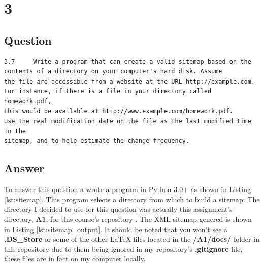 \documentclass[letterpaper,11pt]{article}
\newcommand*{\srcPath}{../src}%
\begin{document}
\clearpage


\section*{3}

\subsection*{Question}

\begin{verbatim}
3.7 	Write a program that can create a valid sitemap based on the 
contents of a directory on your computer's hard disk. Assume 
the file are accessible from a website at the URL http://example.com. 
For instance, if there is a file in your directory called homework.pdf, 
this would be available at http://www.example.com/homework.pdf. 
Use the real modification date on the file as the last modified time in the 
sitemap, and to help estimate the change frequency.
\end{verbatim}

\subsection*{Answer}

To answer this question a wrote a program in Python 3.0+ as shown in Listing \ref{lst:sitemap}. 
This program selects a directory from which to build a sitemap.
The directory I decided to use for this question was actually this assignment's directory, \textbf{A1}, for this course's repository \cite{github}.
The XML sitemap genered is shown in Listing \ref{lst:sitemap_output}. 
It should be noted that you won't see a \textbf{.DS\_Store} or some of the other LaTeX files located in the \textbf{/A1/docs/} folder in this 
repository due to them being ignored in my repository's \textbf{.gitignore} file, these files are in fact on my computer locally. 


 

 
\end{document}
